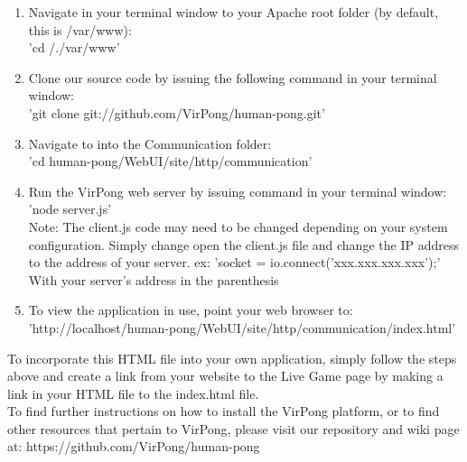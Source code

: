 		\begin{enumerate}
			\item Navigate in your terminal window to your Apache root folder (by default, this is /var/www):\\'cd /./var/www'
			\item Clone our source code by issuing the following command in your terminal window:\\'git clone git://github.com/VirPong/human-pong.git'
			\item Navigate to into the Communication folder:\\'cd human-pong/WebUI/site/http/communication'
			\item Run the VirPong web server by issuing command in your terminal window:\\'node server.js'\\Note: The client.js code may need to be changed depending on your system configuration. Simply change open the client.js file and change the IP address to the address of your server. ex: 'socket = io.connect('xxx.xxx.xxx.xxx');' With your server's address in the parenthesis
			\item To view the application in use, point your web browser to: 'http://localhost/human-pong/WebUI/site/http/communication/index.html'
		\end{enumerate}
		To incorporate this HTML file into your own application, simply follow the steps above and create a link from your website to the Live Game page by making a link in your HTML file to the index.html file.\\To find further instructions on how to install the VirPong platform, or to find other resources that pertain to VirPong, please visit our repository and wiki page at: https://github.com/VirPong/human-pong
